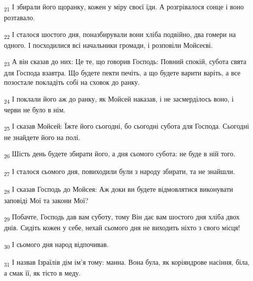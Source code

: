 \begin{tcolorbox}
\textsubscript{21} І збирали його щоранку, кожен у міру своєї їди. А розгрівалося сонце і воно розтавало.
\end{tcolorbox}
\begin{tcolorbox}
\textsubscript{22} І сталося шостого дня, поназбирували вони хліба подвійно, два гомери на одного. І посходилися всі начальники громади, і розповіли Мойсеєві.
\end{tcolorbox}
\begin{tcolorbox}
\textsubscript{23} А він сказав до них: Це те, що говорив Господь: Повний спокій, субота свята для Господа взавтра. Що будете пекти печіть, а що будете варити варіть, а все позостале покладіть собі на сховок до ранку.
\end{tcolorbox}
\begin{tcolorbox}
\textsubscript{24} І поклали його аж до ранку, як Мойсей наказав, і не засмерділось воно, і черви не було в нім.
\end{tcolorbox}
\begin{tcolorbox}
\textsubscript{25} І сказав Мойсей: Їжте його сьогодні, бо сьогодні субота для Господа. Сьогодні не знайдете його на полі.
\end{tcolorbox}
\begin{tcolorbox}
\textsubscript{26} Шість день будете збирати його, а дня сьомого субота: не буде в ній того.
\end{tcolorbox}
\begin{tcolorbox}
\textsubscript{27} І сталося сьомого дня, повиходили були з народу збирати, та не знайшли.
\end{tcolorbox}
\begin{tcolorbox}
\textsubscript{28} І сказав Господь до Мойсея: Аж доки ви будете відмовлятися виконувати заповіді Мої та закони Мої?
\end{tcolorbox}
\begin{tcolorbox}
\textsubscript{29} Побачте, Господь дав вам суботу, тому Він дає вам шостого дня хліба двох днів. Сидіть кожен у себе, нехай сьомого дня не виходить ніхто з свого місця!
\end{tcolorbox}
\begin{tcolorbox}
\textsubscript{30} І сьомого дня народ відпочивав.
\end{tcolorbox}
\begin{tcolorbox}
\textsubscript{31} І назвав Ізраїлів дім ім'я тому: манна. Вона була, як коріяндрове насіння, біла, а смак її, як тісто в меду.
\end{tcolorbox}
